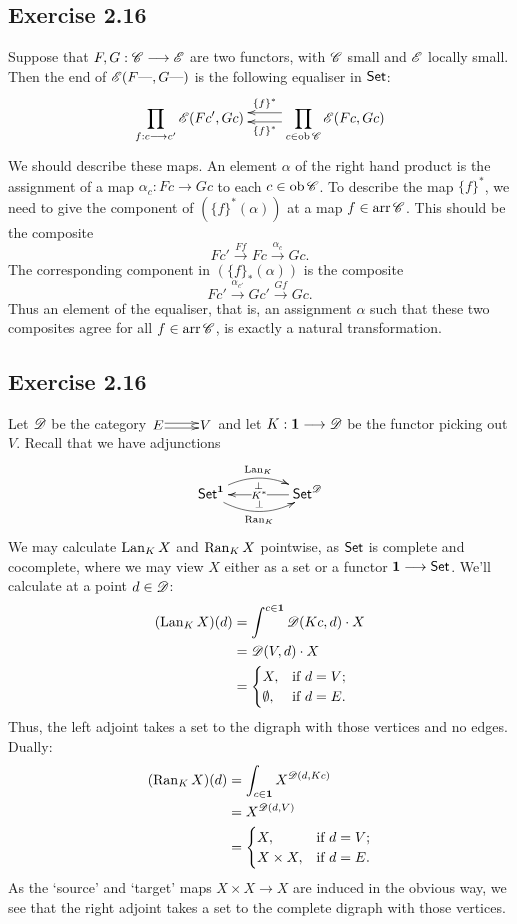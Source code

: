 \documentclass[11pt]{article}
\begin{document}
\begin{solutions}
\subsection*{Exercise 2.16}
Suppose that $F,G:\mathscr{C}\longrightarrow\mathscr{E}$ are two functors, with $\mathscr{C}$ small and $\mathscr{E}$ locally small.
Then the end of $\mathscr{E}(F\textup{---} ,G\textup{---} )$ is the following equaliser in $\operatorname{{\mathsf{Set}}}$:
\[\vcenter{\xymatrix{
\displaystyle\prod_{f:c\to c'}\scrE(Fc',Gc)&%
\displaystyle\prod_{c\in\ob\scrC}\scrE(Fc,Gc)
\ar@<-1ex>[l]_-{\{f\}^*}
\ar@<.51ex>[l]^-{\{f\}^*}
}}\]
We should describe these maps. An element $\alpha$ of the right hand product is the assignment of a map $\alpha_c:Fc\to Gc$ to each $c\in\textup{ob}\,\mathscr{C}$. To describe  the map $\{f\}^*$, we need to give the component of $(\{f\}^*(\alpha))$ at a map $f\in\textup{arr}\,\mathscr{C}$. This should be the composite
\[Fc'\overset{Ff}{\to}Fc\overset{\alpha_c}{\to}Gc.\]
The corresponding component in $(\{f\}_*(\alpha))$ is the composite
\[Fc'\overset{\alpha_{c'}}{\to}Gc'\overset{Gf}{\to}Gc.\]
Thus an element of the equaliser, that is, an assignment $\alpha$ such that these two composites agree for all $f\in\textup{arr}\,\mathscr{C}$, is exactly a natural transformation.
\subsection*{Exercise 2.16}
Let $\mathscr{D}$ be the category 
$\vcenter{\xymatrix@1{
E
\ar@<-.35ex>[r]
\ar@<.5ex>[r]
&%
V%
}}$
and let $K:\textbf{1}\longrightarrow \mathscr{D}$ be the functor picking out $V$. Recall that we have adjunctions
\[\xymatrix@C=1.5cm{
\Set^\textbf{1}
\ar@/^1.2em/[r]^-{\Lan_K}_-{\perp} \ar@/_1.2em/[r]_-{\Ran_K}^-{\perp}&%
\Set^\scrD\ar[l]|{K^*}%
}\]
We may calculate $\operatorname{Lan}_KX$ and $\operatorname{Ran}_KX$ pointwise, as $\operatorname{{\mathsf{Set}}}$ is complete and cocomplete, where we may view $X$ either as a set or a functor $\textbf{1}\longrightarrow\operatorname{{\mathsf{Set}}}$. We'll calculate at a point $d\in\mathscr{D}$:
\begin{alignat*}{2}
(\Lan_KX)(d)
&=
\int^{c\in\textbf{1}}\scrD(Kc,d)\cdot X%
\\
&=
\scrD(V,d)\cdot X%
\\
&=
\begin{cases}
X,&\textup{if }d=V;\\
\emptyset,&\textup{if }d=E.
\end{cases}
\end{alignat*}
Thus, the left adjoint takes a set to the digraph with those vertices and no edges. Dually:
\begin{alignat*}{2}
(\Ran_KX)(d)
&=
\int_{c\in\textbf{1}}X^{\scrD(d,Kc)}%
\\
&=
X^{\scrD(d,V)}%
\\
&=
\begin{cases}
X,&\textup{if }d=V;\\
X\times X,&\textup{if }d=E.
\end{cases}
\end{alignat*}
As the `source' and `target' maps $X\times X\to X$ are induced in the obvious way, we see that the right adjoint takes a set to the complete digraph with those vertices.

\end{solutions}
\end{document}
